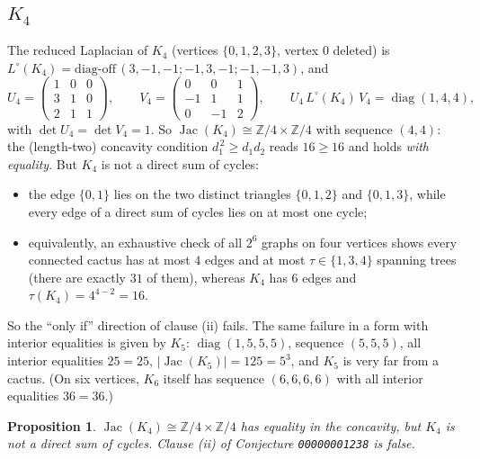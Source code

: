 \documentclass[11pt]{article}
\newtheorem{proposition}{Proposition}
\theoremstyle{definition}
\begin{document}
\subsection{$K_4$}

The reduced Laplacian of $K_4$ (vertices $\{0,1,2,3\}$, vertex $0$ deleted) is
$L^{\circ}(K_4) = \mathrm{diag\text{-}off}\,(3,-1,-1;-1,3,-1;-1,-1,3)$, and
\[
U_4 = \begin{pmatrix} 1&0&0\\ 3&1&0\\ 2&1&1 \end{pmatrix},
\qquad
V_4 = \begin{pmatrix} 0&0&1\\ -1&1&1\\ 0&-1&2 \end{pmatrix},
\qquad
U_4\, L^{\circ}(K_4)\, V_4 = \operatorname{diag}(1,4,4),
\]
with $\det U_4 = \det V_4 = 1$.  So $\operatorname{Jac}(K_4) \cong
\mathbb{Z}/4 \times \mathbb{Z}/4$ with sequence $(4,4)$: the (length-two)
concavity condition $d_1^{\,2} \ge d_1 d_2$ reads $16 \ge 16$ and holds \emph{with
equality}.  But $K_4$ is not a direct sum of cycles:
\begin{itemize}
\item the edge $\{0,1\}$ lies on the two distinct triangles $\{0,1,2\}$ and
      $\{0,1,3\}$, while every edge of a direct sum of cycles lies on at most one
      cycle;
\item equivalently, an exhaustive check of all $2^6$ graphs on four vertices shows
      every connected cactus has at most $4$ edges and at most
      $\tau \in \{1,3,4\}$ spanning trees (there are exactly $31$ of them),
      whereas $K_4$ has $6$ edges and $\tau(K_4) = 4^{4-2} = 16$.
\end{itemize}
So the ``only if'' direction of clause (ii) fails.  The same failure in a form with
interior equalities is given by $K_5$:
$\operatorname{diag}(1,5,5,5)$, sequence $(5,5,5)$, all interior equalities
$25 = 25$, $|\operatorname{Jac}(K_5)| = 125 = 5^3$, and $K_5$ is very far from a
cactus.  (On six vertices, $K_6$ itself has sequence $(6,6,6,6)$ with all interior
equalities $36 = 36$.)

\begin{proposition}\label{prop:B}
$\operatorname{Jac}(K_4) \cong \mathbb{Z}/4 \times \mathbb{Z}/4$ has equality in the
concavity, but $K_4$ is not a direct sum of cycles.  Clause (ii) of Conjecture
\texttt{00000001238} is false.
\end{proposition}
\end{document}
